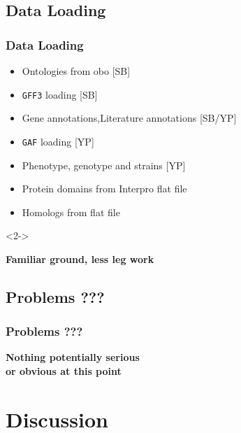 \documentclass[hyperref={pdfpagelabels=false}, compress]{beamer}
\begin{document}
\subsection{Data Loading}
\begin{frame}
  	\frametitle{Data Loading}
  	\begin{itemize}
		\item Ontologies from obo [SB]
       	\item \texttt{GFF3} loading [SB]
       	\item Gene annotations,Literature annotations [SB/YP]
       	\item \texttt{GAF} loading [YP]
       	\item Phenotype, genotype and strains [YP]
       	\item {\color{dark-gray} Protein domains from Interpro flat file}
       	\item {\color{dark-gray} Homologs from flat file}
  	\end{itemize}
  	
	\begin{block}{}<2->
  		\begin{center}
  			\textbf{\Large Familiar ground, less leg work}
		\end{center}
	\end{block}
	
\end{frame}

\subsection{Problems ???}  
\begin{frame}
	\frametitle{Problems ???} 
	\begin{center} 
		\textbf{\Large Nothing potentially serious\\ or obvious at this point}
	\end{center}
\end{frame}


\section{Discussion}
\end{document}
